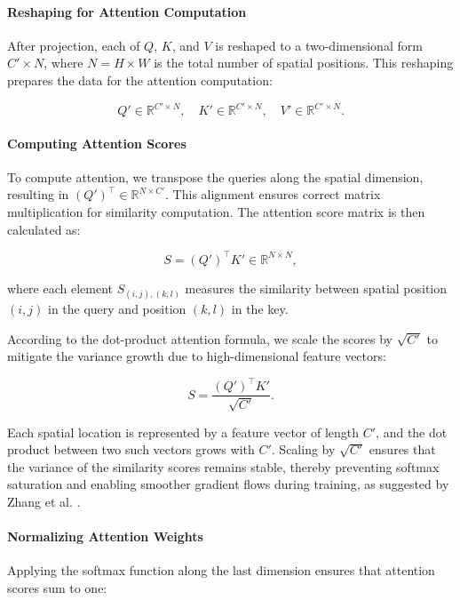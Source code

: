 \paragraph{Reshaping for Attention Computation}

\noindent After projection, each of \(Q\), \(K\), and \(V\) is reshaped to a two-dimensional form \( C' \times N \), where \( N = H \times W \) is the total number of spatial positions. This reshaping prepares the data for the attention computation:

\[
Q' \in \mathbb{R}^{C' \times N}, \quad K' \in \mathbb{R}^{C' \times N}, \quad V' \in \mathbb{R}^{C' \times N}.
\]

\paragraph{Computing Attention Scores}

\noindent To compute attention, we transpose the queries along the spatial dimension, resulting in \( (Q')^\top \in \mathbb{R}^{N \times C'} \). This alignment ensures correct matrix multiplication for similarity computation. The attention score matrix is then calculated as:

\[
S = (Q')^\top K' \in \mathbb{R}^{N \times N},
\]

\noindent where each element \( S_{(i,j),(k,l)} \) measures the similarity between spatial position \((i,j)\) in the query and position \((k,l)\) in the key. 

\noindent According to the dot-product attention formula, we scale the scores by \( \sqrt{C'} \) to mitigate the variance growth due to high-dimensional feature vectors:

\[
S = \frac{(Q')^\top K'}{\sqrt{C'}}.
\]

\noindent Each spatial location is represented by a feature vector of length \( C' \), and the dot product between two such vectors grows with \( C' \). Scaling by \( \sqrt{C'} \) ensures that the variance of the similarity scores remains stable, thereby preventing softmax saturation and enabling smoother gradient flows during training, as suggested by Zhang et al. \cite{zhang2019_sagan}.

\paragraph{Normalizing Attention Weights}

\noindent Applying the softmax function along the last dimension ensures that attention scores sum to one:

